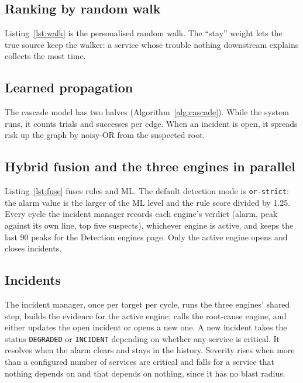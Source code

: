 


\subsection{Ranking by random walk}
Listing~\ref{lst:walk} is the personalised random walk. The ``stay'' weight lets the true source keep the walker: a service whose trouble nothing downstream explains collects the most time.



\subsection{Learned propagation}
The cascade model has two halves (Algorithm~\ref{alg:cascade}). While the system runs, it counts trials and successes per edge. When an incident is open, it spreads risk up the graph by noisy-OR from the suspected root.

\subsection{Hybrid fusion and the three engines in parallel}
Listing~\ref{lst:fuse} fuses rules and ML. The default detection mode is \texttt{or-strict}: the alarm value is the larger of the ML level and the rule score divided by 1.25. Every cycle the incident manager records each engine's verdict (alarm, peak against its own line, top five suspects), whichever engine is active, and keeps the last 90 peaks for the Detection engines page. Only the active engine opens and closes incidents.



\subsection{Incidents}
The incident manager, once per target per cycle, runs the three engines' shared step, builds the evidence for the active engine, calls the root-cause engine, and either updates the open incident or opens a new one. A new incident takes the status \texttt{DEGRADED} or \texttt{INCIDENT} depending on whether any service is critical. It resolves when the alarm clears and stays in the history. Severity rises when more than a configured number of services are critical and falls for a service that nothing depends on and that depends on nothing, since it has no blast radius.

